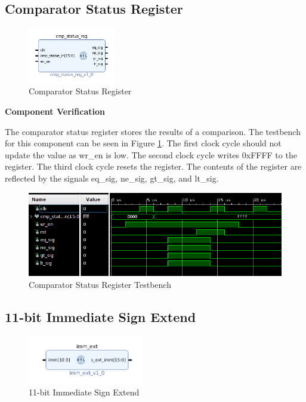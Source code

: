 \documentclass{article}
\newcommand{\stitle}{Component Verification}
\begin{document}
\begin{par}
	\newpage
	
	\subsection{Comparator Status Register}
	
	\begin{figure}[H]
		\centering
		\includegraphics[width=1.5in]{img/cmpStat.png}
		\caption{Comparator Status Register}
	\end{figure}
	
	\textbf{\stitle}
	\begin{par}
		The comparator status register stores the results of a comparison. The testbench for this component can be seen in Figure \ref{fig:cmpregtb}. The first clock cycle should not update the value as wr\_en is low. The second clock cycle writes 0xFFFF to the register. The third clock cycle resets the register. The contents of the register are reflected by the signals eq\_sig, ne\_sig, gt\_sig, and lt\_sig. 
	\end{par}

	\begin{figure}[H]
		\centering
		\includegraphics[width=5in]{img/cmpregtb.png}
		\caption{Comparator Status Register Testbench}
		\label{fig:cmpregtb}
	\end{figure}

	\newpage
	
	\subsection{11-bit Immediate Sign Extend}
	
	\begin{figure}[H]
		\centering
		\includegraphics[width=2in]{img/immExt.png}
		\caption{11-bit Immediate Sign Extend}
	\end{figure}
	

\end{par}
\end{document}

